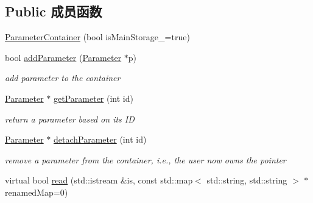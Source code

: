 \subsection*{Public 成员函数}
\begin{DoxyCompactItemize}
\item 
\hyperlink{classg2o_1_1ParameterContainer_a6047d0206008b5cbb366be0fe03246b4}{Parameter\-Container} (bool is\-Main\-Storage\-\_\-=true)
\item 
\hypertarget{classg2o_1_1ParameterContainer_a9c0b1376e780b177f2d36c4ee4f873d7}{bool \hyperlink{classg2o_1_1ParameterContainer_a9c0b1376e780b177f2d36c4ee4f873d7}{add\-Parameter} (\hyperlink{classg2o_1_1Parameter}{Parameter} $\ast$p)}\label{classg2o_1_1ParameterContainer_a9c0b1376e780b177f2d36c4ee4f873d7}

\begin{DoxyCompactList}\small\item\em add parameter to the container \end{DoxyCompactList}\item 
\hypertarget{classg2o_1_1ParameterContainer_ad55d9e6d2adaa4680f74be98e2ae3784}{\hyperlink{classg2o_1_1Parameter}{Parameter} $\ast$ \hyperlink{classg2o_1_1ParameterContainer_ad55d9e6d2adaa4680f74be98e2ae3784}{get\-Parameter} (int id)}\label{classg2o_1_1ParameterContainer_ad55d9e6d2adaa4680f74be98e2ae3784}

\begin{DoxyCompactList}\small\item\em return a parameter based on its I\-D \end{DoxyCompactList}\item 
\hypertarget{classg2o_1_1ParameterContainer_a6e57cf684d92f0ceeba8b4923fa41864}{\hyperlink{classg2o_1_1Parameter}{Parameter} $\ast$ \hyperlink{classg2o_1_1ParameterContainer_a6e57cf684d92f0ceeba8b4923fa41864}{detach\-Parameter} (int id)}\label{classg2o_1_1ParameterContainer_a6e57cf684d92f0ceeba8b4923fa41864}

\begin{DoxyCompactList}\small\item\em remove a parameter from the container, i.\-e., the user now owns the pointer \end{DoxyCompactList}\item 
\hypertarget{classg2o_1_1ParameterContainer_ae5883ac8e2313cab310cf067b0ba12bf}{virtual bool \hyperlink{classg2o_1_1ParameterContainer_ae5883ac8e2313cab310cf067b0ba12bf}{read} (std\-::istream \&is, const std\-::map$<$ std\-::string, std\-::string $>$ $\ast$renamed\-Map=0)}\label{classg2o_1_1ParameterContainer_ae5883ac8e2313cab310cf067b0ba12bf}


\end{DoxyCompactItemize}
